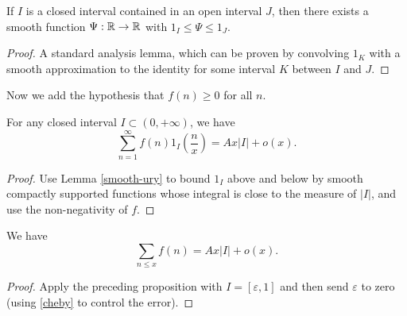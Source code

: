 \begin{lemma}\label{smooth-ury}  If $I$ is a closed interval contained in an open interval $J$, then there exists a smooth function $\Psi: \R \to \R$ with $1_I \leq \Psi \leq 1_J$.
\end{lemma}

\begin{proof}  A standard analysis lemma, which can be proven by convolving $1_K$ with a smooth approximation to the identity for some interval $K$ between $I$ and $J$.
\end{proof}

Now we add the hypothesis that $f(n) \geq 0$ for all $n$.

\begin{proposition}  For any closed interval $I \subset (0,+\infty)$, we have
  $$ \sum_{n=1}^\infty f(n) 1_I( \frac{n}{x} ) = A x |I|  + o(x).$$
\end{proposition}

\begin{proof}  Use Lemma \ref{smooth-ury} to bound $1_I$ above and below by smooth compactly supported functions whose integral is close to the measure of $|I|$, and use the non-negativity of $f$.
\end{proof}

\begin{corollary}  We have
$$ \sum_{n\leq x} f(n) = A x |I|  + o(x).$$
\end{corollary}

\begin{proof}
  Apply the preceding proposition with $I = [\varepsilon,1]$ and then send $\varepsilon$ to zero (using \eqref{cheby} to control the error).
\end{proof}
